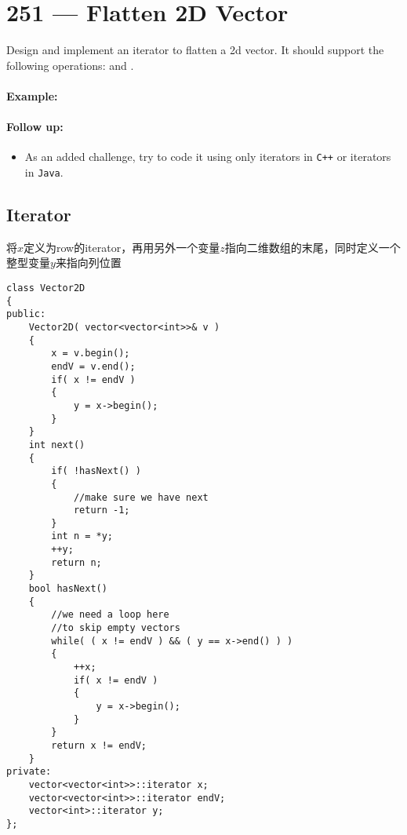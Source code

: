 \section{251 --- Flatten 2D Vector}
Design and implement an iterator to flatten a 2d vector. It should support the following operations:  and .

\paragraph{Example:}

\begin{flushleft}







\end{flushleft}

\paragraph{Follow up:}
\begin{itemize}
\item As an added challenge, try to code it using only iterators in \texttt{C++} or iterators in \texttt{Java}.
\end{itemize}

\subsection{Iterator}
将$x$定义为row的iterator，再用另外一个变量$z$指向二维数组的末尾，同时定义一个整型变量$y$来指向列位置
\setcounter{lstlisting}{0}
\begin{lstlisting}[style=customc, caption={Iterator}]
class Vector2D
{
public:
    Vector2D( vector<vector<int>>& v )
    {
        x = v.begin();
        endV = v.end();
        if( x != endV )
        {
            y = x->begin();
        }
    }
    int next()
    {
        if( !hasNext() )
        {
            //make sure we have next
            return -1;
        }
        int n = *y;
        ++y;
        return n;
    }
    bool hasNext()
    {
        //we need a loop here
        //to skip empty vectors
        while( ( x != endV ) && ( y == x->end() ) )
        {
            ++x;
            if( x != endV )
            {
                y = x->begin();
            }
        }
        return x != endV;
    }
private:
    vector<vector<int>>::iterator x;
    vector<vector<int>>::iterator endV;
    vector<int>::iterator y;
};
\end{lstlisting}